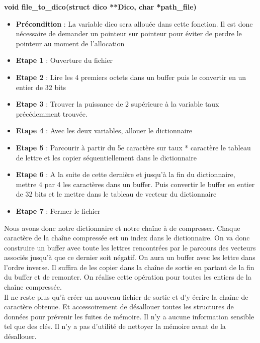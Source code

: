         \textbf{void file\_to\_dico(struct dico **Dico, char *path\_file)}\\
        \begin{itemize}
            \item \textbf{Précondition} : La variable dico sera allouée dans cette fonction. Il est donc nécessaire de demander un pointeur sur pointeur pour éviter de perdre le pointeur au moment de l'allocation\\
            \item \textbf{Etape 1} : Ouverture du fichier\\
            \item \textbf{Etape 2} : Lire les 4 premiers octets dans un buffer puis le convertir en un entier de 32 bits\\
            \item \textbf{Etape 3} : Trouver la puissance de 2 supérieure à la variable taux précédemment trouvée.\\
            \item \textbf{Etape 4} : Avec les deux variables, allouer le dictionnaire\\
            \item \textbf{Etape 5} : Parcourir à partir du 5e caractère sur taux * caractère le tableau de lettre et les copier séquentiellement dans le dictionnaire\\
            \item \textbf{Etape 6} : A la suite de cette dernière et jusqu'à la fin du dictionnaire, mettre 4 par 4 les caractères dans un buffer. Puis convertir le buffer en entier de 32 bits et le mettre dans le tableau de vecteur du dictionnaire\\
            \item \textbf{Etape 7} : Fermer le fichier\\
        \end{itemize}
		Nous avons donc notre dictionnaire et notre chaîne à de compresser. Chaque caractère de la chaîne compressée est un index dans le dictionnaire. On va donc construire un buffer avec toute les lettres rencontrées par le parcours des vecteurs associés jusqu'à que ce dernier soit négatif. On aura un buffer avec les lettre dans l'ordre inverse. Il suffira de les copier dans la chaîne de sortie en partant de la fin du buffer et de remonter. On réalise cette opération pour toutes les entiers de la chaîne compressée.\\
		Il ne reste plus qu'à créer un nouveau fichier de sortie et d'y écrire la chaîne de caractère obtenue. Et accessoirement de désallouer toutes les structures de données pour prévenir les fuites de mémoire. Il n'y a aucune information sensible tel que des clés. Il n'y a pas d'utilité de nettoyer la mémoire avant de la désallouer.
		\newpage

